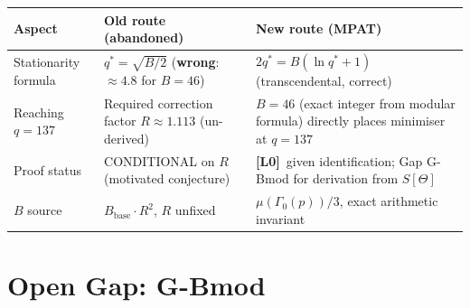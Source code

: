\documentclass[12pt,a4paper]{article}
\theoremstyle{definition}
\theoremstyle{remark}
\newcommand{\Lzero}{\textbf{[L0]}}
\begin{document}
\begin{center}
\renewcommand{\arraystretch}{1.3}
\begin{tabular}{p{3.8cm} p{5cm} p{5cm}}
\toprule
\textbf{Aspect} & \textbf{Old route (abandoned)} & \textbf{New route (MPAT)} \\
\midrule
Stationarity formula
  & $q^* = \sqrt{B/2}$ \newline (\textbf{wrong}: $\approx 4.8$ for $B=46$)
  & $2q^* = B(\ln q^* + 1)$ \newline (transcendental, correct) \\
Reaching $q = 137$
  & Required correction factor $R \approx 1.113$ (un-derived)
  & $B = 46$ (exact integer from modular formula) directly places minimiser at $q = 137$ \\
Proof status
  & CONDITIONAL on $R$ (motivated conjecture)
  & \Lzero\ given identification; Gap G-Bmod for derivation from $S[\Theta]$ \\
$B$ source
  & $B_{\mathrm{base}} \cdot R^2$, $R$ unfixed
  & $\mu(\Gamma_0(p))/3$, exact arithmetic invariant \\
\bottomrule
\end{tabular}
\end{center}

\section{Open Gap: G-Bmod}
\label{sec:mpat:gap}
\end{document}
